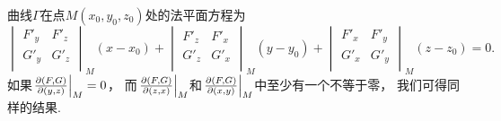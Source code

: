 曲线\(\Gamma\)在点\(M(x_0,y_0,z_0)\)处的法平面方程为
\begin{equation}\label{equation:多元函数微分学的几何应用.曲线的法平面方程.变式2}
	\begin{vmatrix}
		F'_y & F'_z \\
		G'_y & G'_z \\
	\end{vmatrix}_M
	(x-x_0)
	+ \begin{vmatrix}
		F'_z & F'_x \\
		G'_z & G'_x \\
	\end{vmatrix}_M
	(y-y_0)
	+ \begin{vmatrix}
		F'_x & F'_y \\
		G'_x & G'_y \\
	\end{vmatrix}_M
	(z-z_0)
	= 0.
\end{equation}
如果\(\eval{\jacobi{F,G}{y,z}}_M = 0\)，
而\(\eval{\jacobi{F,G}{z,x}}_M\)和\(\eval{\jacobi{F,G}{x,y}}_M\)中至少有一个不等于零，
我们可得同样的结果.
